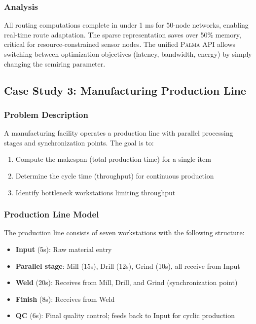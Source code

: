 \documentclass[11pt,a4paper]{article}
\theoremstyle{plain}
\theoremstyle{definition}
\newcommand{\palma}{\textsc{Palma}}
\begin{document}
\subsubsection{Analysis}

All routing computations complete in under 1 ms for 50-node networks, enabling real-time route adaptation. The sparse representation saves over 50\% memory, critical for resource-constrained sensor nodes. The unified \palma{} API allows switching between optimization objectives (latency, bandwidth, energy) by simply changing the semiring parameter.

\subsection{Case Study 3: Manufacturing Production Line}

\subsubsection{Problem Description}

A manufacturing facility operates a production line with parallel processing stages and synchronization points. The goal is to:
\begin{enumerate}
    \item Compute the makespan (total production time) for a single item
    \item Determine the cycle time (throughput) for continuous production
    \item Identify bottleneck workstations limiting throughput
\end{enumerate}

\subsubsection{Production Line Model}

The production line consists of seven workstations with the following structure:
\begin{itemize}
    \item \textbf{Input} (5s): Raw material entry
    \item \textbf{Parallel stage}: Mill (15s), Drill (12s), Grind (10s), all receive from Input
    \item \textbf{Weld} (20s): Receives from Mill, Drill, and Grind (synchronization point)
    \item \textbf{Finish} (8s): Receives from Weld
    \item \textbf{QC} (6s): Final quality control; feeds back to Input for cyclic production
\end{itemize}
\end{document}

